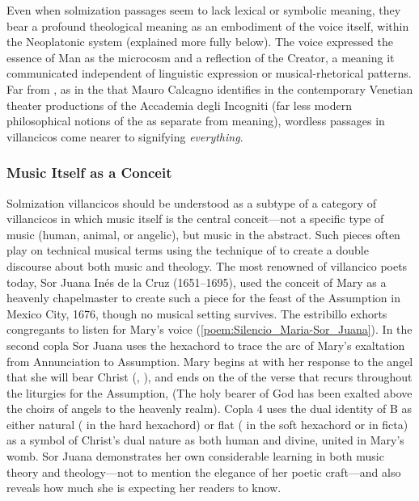Even when solmization passages seem to lack lexical or symbolic meaning, they
bear a profound theological meaning as an embodiment of the voice itself,
within the Neoplatonic system (explained more fully below).
The voice expressed the essence of Man as the microcosm and a reflection of the
Creator, a meaning it communicated independent of linguistic expression or
musical-rhetorical patterns.
Far from , as in the  that Mauro Calcagno identifies in the contemporary Venetian theater
productions of the Accademia degli Incogniti (far less modern philosophical
notions of the  as separate from meaning), wordless
passages in villancicos come nearer to signifying \emph{everything}.%
    \Autocites
    {Calcagno:SignifyingNothing}
    {Barthes:GrainOfVoice}
    {Dolar:Voice}
    {Cavarero:Voice}
    \citXXX[Feldman ed. vol.]

\subsubsection{Music Itself as a Conceit}

Solmization villancicos should be understood as a subtype of a category of
villancicos in which music itself is the central conceit---not a specific type
of music (human, animal, or angelic), but music in the abstract.
Such pieces often play on technical musical terms using the technique of
 to create a double discourse about both music and theology.
The most renowned of villancico poets today, Sor Juana Inés de la Cruz
(1651--1695), used the conceit of Mary as a heavenly chapelmaster to create
such a piece for the feast of the Assumption in Mexico City, 1676, though no
musical setting survives.%
    \Autocite[, ]{SorJuana:VC} 
The estribillo exhorts congregants to listen for Mary's voice
(\cref{poem:Silencio_Maria-Sor_Juana}).
In the second copla Sor Juana uses the hexachord to trace the arc of Mary's
exaltation from Annunciation to Assumption. 
Mary begins at  with her response to the angel that she will bear
Christ (, ), and ends on the
 of the verse that recurs throughout the liturgies for the Assumption,
 (The holy bearer of God has been exalted above the choirs of angels to
the heavenly realm).
Copla 4 uses the dual identity of B as either natural ( in the hard
hexachord) or flat ( in the soft hexachord or in ficta) as a symbol of
Christ's dual nature as both human and divine, united in Mary's womb.
Sor Juana demonstrates her own considerable learning in both music theory and
theology---not to mention the elegance of her poetic craft---and also reveals
how much she is expecting her readers to know.%
    \Autocites
    {Stevenson:SorJuanaMusicalRapports}
    {Tenorio:SorJuana}

